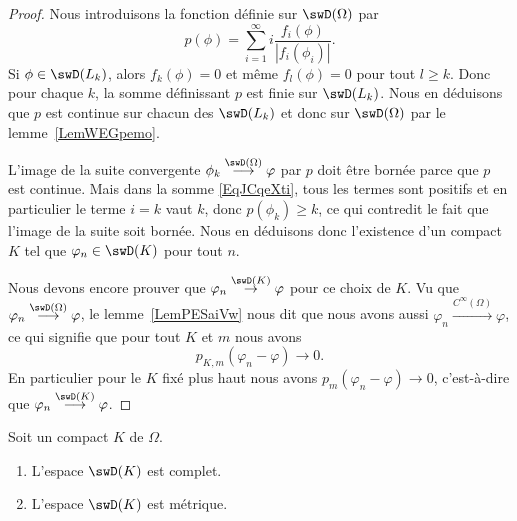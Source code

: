 \begin{proof}
	Nous introduisons la fonction définie sur \( \swD(\Omega)\) par
	\begin{equation}    \label{EqJCqeXti}
		p(\phi)=\sum_{i=1}^{\infty}i\frac{ f_i(\phi) }{ | f_i(\phi_i) | }.
	\end{equation}
	Si \( \phi\in \swD(L_k)\), alors \( f_k(\phi)=0\) et même \( f_{l}(\phi)=0\) pour tout \( l\geq k\). Donc pour chaque \( k\), la somme définissant \( p\) est finie sur \( \swD(L_k)\). Nous en déduisons que \( p\) est continue sur chacun des \( \swD(L_k)\) et donc sur \( \swD(\Omega)\) par le lemme~\ref{LemWEGpemo}.

	L'image de la suite convergente \( \phi_k\stackrel{\swD(\Omega)}{\longrightarrow}\varphi\) par \( p\) doit être bornée parce que \( p\) est continue. Mais dans la somme  \eqref{EqJCqeXti}, tous les termes sont positifs et en particulier le terme \( i=k\) vaut \( k\), donc \( p(\phi_k)\geq k\), ce qui contredit le fait que l'image de la suite soit bornée. Nous en déduisons donc l'existence d'un compact \( K\) tel que \( \varphi_n\in \swD(K)\) pour tout \( n\).

	Nous devons encore prouver que \( \varphi_n\stackrel{\swD(K)}{\to}\varphi\) pour ce choix de \( K\). Vu que \( \varphi_n\stackrel{\swD(\Omega)}{\longrightarrow}\varphi\), le lemme~\ref{LemPESaiVw} nous dit que nous avons aussi \( \varphi_n\stackrel{ C^{\infty}(\Omega)}{\longrightarrow}\varphi\), ce qui signifie que pour tout \( K\) et \( m\) nous avons
	\begin{equation}
		p_{K,m}(\varphi_n-\varphi)\to 0.
	\end{equation}
	En particulier pour le \( K\) fixé plus haut nous avons \( p_m(\varphi_n-\varphi)\to 0\), c'est-à-dire que \( \varphi_n\stackrel{\swD(K)}{\longrightarrow}\varphi\).

\end{proof}


\begin{proposition} \label{PropQAEVcTi}
	Soit un compact \( K\) de \( \Omega\).
	\begin{enumerate}
		\item
		      L'espace \( \swD(K)\) est complet.
		\item
		      L'espace \( \swD(K)\) est métrique.
	\end{enumerate}
\end{proposition}

